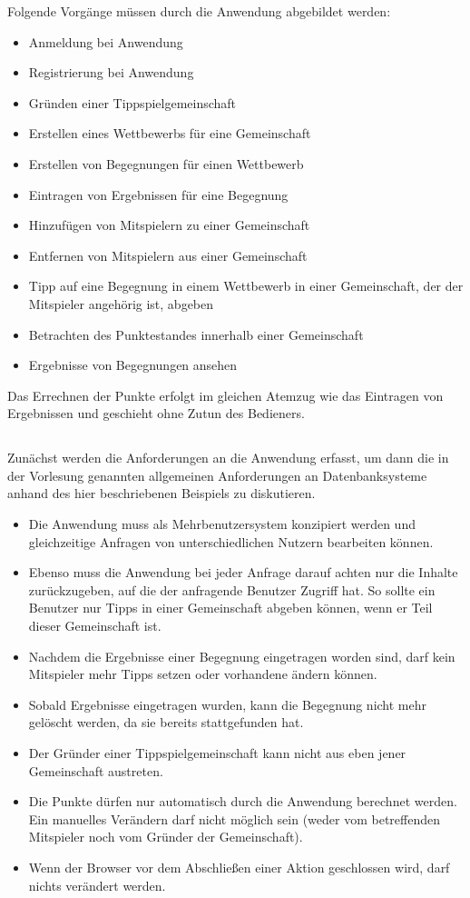 \documentclass[ngerman]{gdb-aufgabenblatt}
\begin{document}
		Folgende Vorgänge müssen durch die Anwendung abgebildet werden:
		\begin{itemize}
			\item	Anmeldung bei Anwendung
			\item	Registrierung bei Anwendung
			\item	Gründen einer Tippspielgemeinschaft
			\item	Erstellen eines Wettbewerbs für eine Gemeinschaft
			\item	Erstellen von Begegnungen für einen Wettbewerb
			\item	Eintragen von Ergebnissen für eine Begegnung
			\item	Hinzufügen von Mitspielern zu einer Gemeinschaft
			\item	Entfernen von Mitspielern aus einer Gemeinschaft
			\item	Tipp auf eine Begegnung in einem Wettbewerb in einer Gemeinschaft, der der Mitspieler angehörig ist, abgeben
			\item	Betrachten des Punktestandes innerhalb einer Gemeinschaft
			\item	Ergebnisse von Begegnungen ansehen
		\end{itemize}
		Das Errechnen der Punkte erfolgt im gleichen Atemzug wie das Eintragen von Ergebnissen und geschieht ohne Zutun des Bedieners.
	\subsection{} %
		Zunächst werden die Anforderungen an die Anwendung erfasst, um dann die in der Vorlesung genannten allgemeinen Anforderungen an Datenbanksysteme anhand des hier beschriebenen Beispiels zu diskutieren.
		
		\begin{itemize}
			\item	Die Anwendung muss als Mehrbenutzersystem konzipiert werden und gleichzeitige Anfragen von unterschiedlichen Nutzern bearbeiten können. 
			\item	Ebenso muss die Anwendung bei jeder Anfrage darauf achten nur die Inhalte zurückzugeben, auf die der anfragende Benutzer Zugriff hat. So sollte ein Benutzer nur Tipps in einer Gemeinschaft abgeben können, wenn er Teil dieser Gemeinschaft ist.
			\item	Nachdem die Ergebnisse einer Begegnung eingetragen worden sind, darf kein Mitspieler mehr Tipps setzen oder vorhandene ändern können.
			\item	Sobald Ergebnisse eingetragen wurden, kann die Begegnung nicht mehr gelöscht werden, da sie bereits stattgefunden hat.
			\item	Der Gründer einer Tippspielgemeinschaft kann nicht aus eben jener Gemeinschaft austreten.
			\item	Die Punkte dürfen nur automatisch durch die Anwendung berechnet werden. Ein manuelles Verändern darf nicht möglich sein (weder vom betreffenden Mitspieler noch vom Gründer der Gemeinschaft).
			\item	Wenn der Browser vor dem Abschließen einer Aktion geschlossen wird, darf nichts verändert werden.
		\end{itemize}
		
\end{document}
